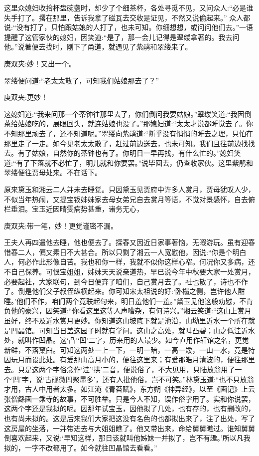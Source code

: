 \begin{parag}
    这里众媳妇收拾杯盘碗盏时，却少了个细茶杯，各处寻觅不见，又问众人:“必是谁失手打了。撂在那里，告诉我拿了磁瓦去交收是证见，不然又说偷起来。” 众人都说:“没有打了，只怕跟姑娘的人打了，也未可知。你细想想，或问问他们去。”一语提醒了这管家伙的媳妇，因笑道:“是了，那一会儿记得是翠缕拿著的。我去问他。”说著便去找时，刚下了甬道，就遇见了紫鹃和翠缕来了。\begin{note}庚双夹:妙！又出一个。\end{note}翠缕便问道:“老太太散了，可知我们姑娘那去了？”\begin{note}庚双夹:更妙！\end{note}这媳妇道:“我来问那一个茶钟往那里去了，你们倒问我要姑娘。”翠缕笑道:“我因倒茶给姑娘吃的，展眼回头，就连姑娘也没了。”那媳妇道:“太太才说都睡觉去了。你不知那里顽去了，还不知道呢。”翠缕向紫鹃道:“断乎没有悄悄的睡去之理，只怕在那里走了一走。如今见老太太散了，赶过前边送去，也未可知。我们且往前边找找去。有了姑娘，自然你的茶钟也有了。你明日一早再找，有什么忙的。”媳妇笑道:“有了下落就不必忙了，明儿就和你要罢。”说毕回去，仍查收家伙。这里紫鹃和翠缕便往贾母处来。不在话下。
\end{parag}


\begin{parag}
    原来黛玉和湘云二人并未去睡觉。只因黛玉见贾府中许多人赏月，贾母犹叹人少，不似当年热闹，又提宝钗姊妹家去母女弟兄自去赏月等语，不觉对景感怀，自去俯栏垂泪。宝玉近因晴雯病势甚重，诸务无心，\begin{note}庚双夹:带一笔，妙！更觉谨密不漏。\end{note}王夫人再四遣他去睡，他也便去了。探春又因近日家事著恼，无暇游玩。虽有迎春惜春二人，偏又素日不大甚合。所以只剩了湘云一人宽慰他，因说:“你是个明白人，何必作此形像自苦。我也和你一样，我就不似你这样心窄。何况你又多病，还不自己保养。可恨宝姐姐，姊妹天天说亲道热，早已说今年中秋要大家一处赏月，必要起社，大家联句，到今日便弃了咱们，自己赏月去了。社也散了，诗也不作了。倒是他们父子叔侄纵横起来。你可知宋太祖说的好:‘卧榻之侧，岂许他人酣睡。’他们不作，咱们两个竟联起句来，明日羞他们一羞。”黛玉见他这般劝慰，不肯负他的豪兴，因笑道:“你看这里这等人声嘈杂，有何诗兴。”湘云笑道:“这山上赏月虽好，终不及近水赏月更妙。你知道这山坡底下就是池沿，山坳里近水一个所在就是凹晶馆。可知当日盖这园子时就有学问。这山之高处，就叫凸碧；山之低洼近水处，就叫作凹晶。这‘凸’‘凹’二字，历来用的人最少。如今直用作轩馆之名，更觉新鲜，不落窠臼。可知这两处一上一下，一明一暗，一高一矮，一山一水，竟是特因玩月而设此处。有爱那山高月小的，便往这里来；有爱那皓月清波的，便往那里去。只是这两个字俗念作‘洼’‘拱’二音，便说俗了，不大见用，只陆放翁用了一个‘凹’字，说‘古砚微凹聚墨多’，还有人批他俗，岂不可笑。”林黛玉道:“也不只放翁才用，古人中用者太多。如江淹《青苔赋》，东方朔《神异经》，以至《画记》上云张僧繇画一乘寺的故事，不可胜举。只是今人不知，误作俗字用了。实和你说罢，这两个字还是我拟的呢。因那年试宝玉，因他拟了几处，也有存的，也有删改的，也有尚未拟的。这是后来我们大家把这没有名色的也都拟出来了，注了出处，写了这房屋的坐落，一并带进去与大姐姐瞧了。他又带出来，命给舅舅瞧过。谁知舅舅倒喜欢起来，又说:‘早知这样，那日该就叫他姊妹一并拟了，岂不有趣。’所以凡我拟的，一字不改都用了。如今就往凹晶馆去看看。”
\end{parag}


